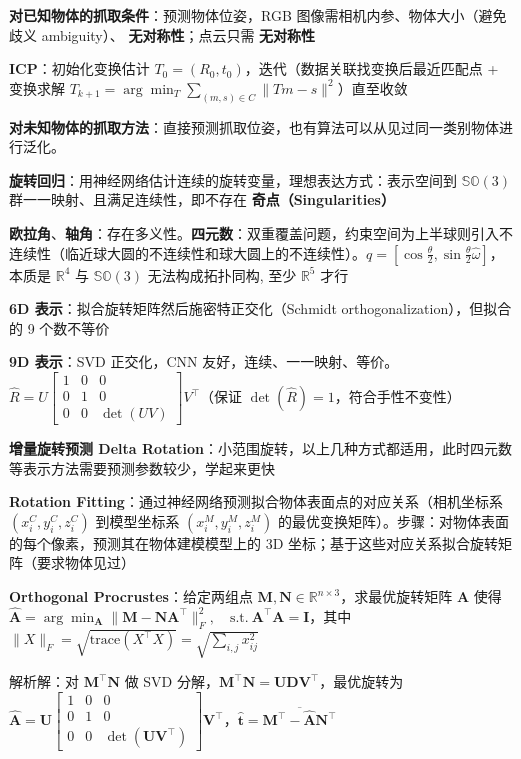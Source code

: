 \documentclass[
  8pt]{extarticle}
\begin{document}
\begin{multicols*}{4}
\textbf{对已知物体的抓取条件}：预测物体位姿，RGB
图像需相机内参、物体大小（避免歧义 ambiguity）、
\textbf{无对称性}；点云只需 \textbf{无对称性}

\textbf{ICP}：初始化变换估计
\(T_0 = (R_0, t_0)\)，迭代（数据关联找变换后最近匹配点 + 变换求解
\(T_{k+1} = \arg \min_T \sum_{(m,s) \in C} \| Tm - s \|^2\)）直至收敛

\textbf{对未知物体的抓取方法}：直接预测抓取位姿，也有算法可以从见过同一类别物体进行泛化。

\textbf{旋转回归}：用神经网络估计连续的旋转变量，理想表达方式：表示空间到
\(\mathbb{SO}(3)\) 群一一映射、且满足连续性，即不存在
\textbf{奇点（Singularities）}

\textbf{欧拉角}、\textbf{轴角}：存在多义性。\textbf{四元数}：双重覆盖问题，约束空间为上半球则引入不连续性（临近球大圆的不连续性和球大圆上的不连续性）。\(q = \left[\cos\frac{\theta}{2}, \sin\frac{\theta}{2} \hat{\omega}\right]\)，本质是
\(\mathbb{R}^4\) 与 \(\mathbb{SO}(3)\) 无法构成拓扑同构, 至少
\(\mathbb{R}^5\) 才行

\textbf{6D 表示}：拟合旋转矩阵然后施密特正交化（Schmidt
orthogonalization），但拟合的 9 个数不等价

\textbf{9D 表示}：SVD 正交化，CNN
友好，连续、一一映射、等价。\(\hat{R} = U\begin{bmatrix} 1 & 0 & 0 \\ 0 & 1 & 0 \\ 0 & 0 & \det(UV) \end{bmatrix}V^{\top}\)（保证
\(\det(\hat{R}) = 1\)，符合手性不变性）

\textbf{增量旋转预测 Delta
Rotation}：小范围旋转，以上几种方式都适用，此时四元数等表示方法需要预测参数较少，学起来更快

\textbf{Rotation
Fitting}：通过神经网络预测拟合物体表面点的对应关系（相机坐标系
\((x_i^C, y_i^C, z_i^C)\) 到模型坐标系 \((x_i^M, y_i^M, z_i^M)\)
的最优变换矩阵）。步骤：对物体表面的每个像素，预测其在物体建模模型上的
3D 坐标；基于这些对应关系拟合旋转矩阵（要求物体见过）

\textbf{Orthogonal Procrustes}：给定两组点
\(\mathbf{M}, \mathbf{N} \in \mathbb{R}^{n \times 3}\)，求最优旋转矩阵
\(\mathbf{A}\) 使得
\(\hat{\mathbf{A}} = \arg\min_{\mathbf{A}} \|\mathbf{M} - \mathbf{N}\mathbf{A}^\top\|_F^2, \quad \text{s.t.}~\mathbf{A}^\top\mathbf{A} = \mathbf{I}\)，其中
\(\|X\|_F = \sqrt{\text{trace}(X^{\top}X)} = \sqrt{\sum_{i,j} x_{ij}^2}\)

解析解：对 \(\mathbf{M}^\top\mathbf{N}\) 做 SVD
分解，\(\mathbf{M}^\top\mathbf{N} = \mathbf{UDV}^\top\)，最优旋转为
\(\hat{\mathbf{A}} = \mathbf{U}\begin{bmatrix} 1 & 0 & 0 \\ 0 & 1 & 0 \\ 0 & 0 & \det(\mathbf{UV}^{\top}) \end{bmatrix}\mathbf{V}^{\top}\)，\(\hat{\mathbf{t}} = \overline{\mathbf{M}^{\top} - \hat{\mathbf{A}} \mathbf{N}^{\top}}\)


\end{multicols*}
\end{document}
